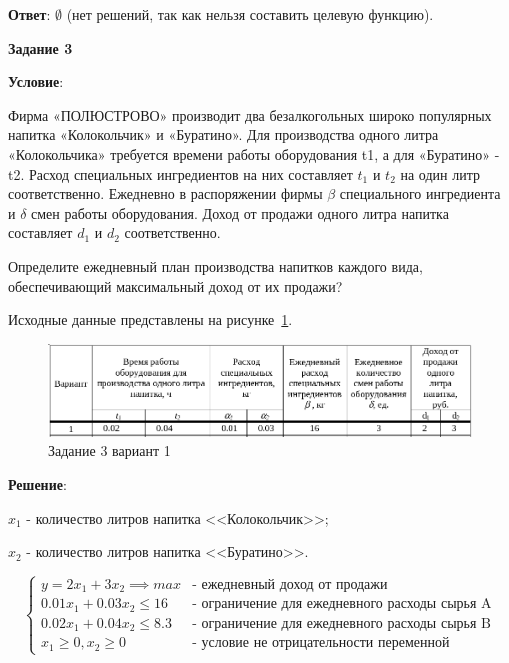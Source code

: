 \textbf{Ответ}: $\emptyset$ (нет решений, так как нельзя составить целевую функцию).

\newpage

\begin{center}
  \textbf{Задание 3}
\end{center}

\textbf{Условие}:

Фирма «ПОЛЮСТРОВО» производит два безалкогольных широко популярных напитка «Колокольчик» и «Буратино».
Для производства одного литра «Колокольчика» требуется времени работы оборудования t1,
а для «Буратино» - t2.
Расход специальных ингредиентов на них составляет $t_1$ и $t_2$ на один литр соответственно.
Ежедневно в распоряжении фирмы $\beta$ специального ингредиента и $\delta$ смен работы оборудования.
Доход от продажи одного литра напитка составляет $d_1$ и $d_2$ соответственно.

Определите ежедневный план производства напитков каждого вида,
обеспечивающий максимальный доход от их продажи?

Исходные данные представлены на рисунке~\ref{fig:task3_1}.

\begin{figure}[!htb]
  \centering

  \includegraphics[width=16cm]
  {inc/task3_1.png}

  \caption{Задание 3 вариант 1}
  \label{fig:task3_1}
\end{figure}


\textbf{Решение}:

$x_1$ - количество литров напитка <<Колокольчик>>;

$x_2$ - количество литров напитка <<Буратино>>.

$$
\begin{cases}
  y = 2 x_1 + 3 x_2 \implies max &\text{- ежедневный доход от продажи}\\
  0.01 x_1 + 0.03 x_2 \leq 16 &\text{- ограничение для ежедневного расходы сырья A}\\
  0.02 x_1 + 0.04 x_2 \leq 8.3 &\text{- ограничение для ежедневного расходы сырья B}\\
  x_1 \geq 0, x_2 \geq 0 &\text{- условие не отрицательности переменной}
\end{cases}
$$


